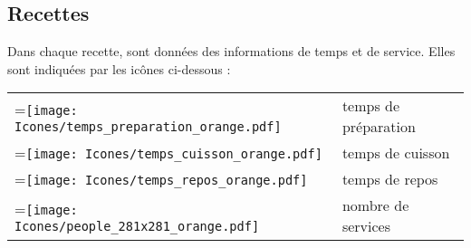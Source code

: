 \subsection*{Recettes}
Dans chaque recette, sont données des informations de temps et de service. Elles sont indiquées par les icônes ci-dessous : 
\vskip 2mm
\begin{tabular}{ l l }
\setbox0=\hbox{\texttt{[image: Icones/temps\_preparation\_orange.pdf]}} \parbox{\wd0}{}  
	& temps de pr\'eparation  \\ 
=\hbox{\texttt{[image: Icones/temps\_cuisson\_orange.pdf]}} \parbox{\wd0}{}  
	& temps de cuisson  \\ 
=\hbox{\texttt{[image: Icones/temps\_repos\_orange.pdf]}} \parbox{\wd0}{}  
	& temps de repos  \\ 
=\hbox{\texttt{[image: Icones/people\_281x281\_orange.pdf]}} \parbox{\wd0}{}  
	& nombre de services  \\ 
\end{tabular}
